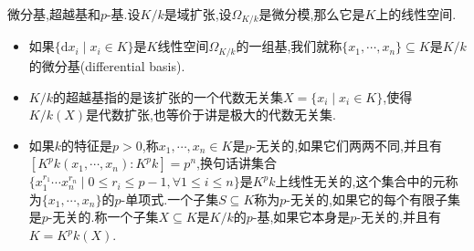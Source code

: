 微分基,超越基和$p$-基.设$K/k$是域扩张,设$\Omega_{K/k}$是微分模,那么它是$K$上的线性空间.
\begin{itemize}
	\item 如果$\{\mathrm{d}x_i\mid x_i\in K\}$是$K$线性空间$\Omega_{K/k}$的一组基,我们就称$\{x_1,\cdots,x_n\}\subseteq K$是$K/k$的微分基(differential basis).
	\item $K/k$的超越基指的是该扩张的一个代数无关集$X=\{x_i\mid x_i\in K\}$,使得$K/k(X)$是代数扩张,也等价于讲是极大的代数无关集.
	\item 如果$k$的特征是$p>0$,称$x_1,\cdots,x_n\in K$是$p$-无关的,如果它们两两不同,并且有$[K^pk(x_1,\cdots,x_n):K^pk]=p^n$,换句话讲集合$\{x_1^{r_1}\cdots x_n^{r_n}\mid 0\le r_i\le p-1,\forall 1\le i\le n\}$是$K^pk$上线性无关的,这个集合中的元称为$\{x_1,\cdots,x_n\}$的$p$-单项式.一个子集$S\subseteq K$称为$p$-无关的,如果它的每个有限子集是$p$-无关的.称一个子集$X\subseteq K$是$K/k$的$p$-基,如果它本身是$p$-无关的,并且有$K=K^pk(X)$.
\end{itemize}
